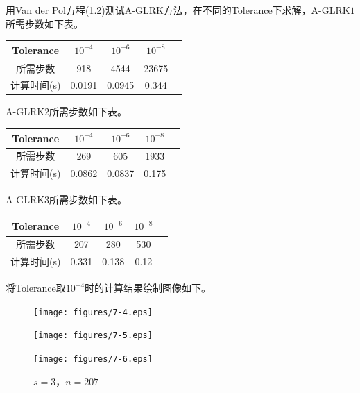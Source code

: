 \documentclass[lang=cn,10pt,bibend=bibtex]{elegantbook}
\begin{document}
用Van der Pol方程(1.2)测试A-GLRK方法，在不同的Tolerance下求解，A-GLRK$1$所需步数如下表。

\vspace{-.8em}
\begin{table}[H]
  \centering
  \begin{tabular}{c|cccc}
    Tolerance & $10^{-4}$ & $10^{-6}$ & $10^{-8}$ \\ \hline
    所需步数 & 918 & 4544 & 23675   \\
    计算时间(s) & 0.0191  & 0.0945  & 0.344  
  \end{tabular}
\end{table}
\vspace{-.8em}

A-GLRK$2$所需步数如下表。

\vspace{-.8em}
\begin{table}[H]
  \centering
  \begin{tabular}{c|cccc}
    Tolerance & $10^{-4}$ & $10^{-6}$ & $10^{-8}$ \\ \hline
    所需步数 & 269 & 605 & 1933   \\
    计算时间(s) & 0.0862  & 0.0837  & 0.175  
  \end{tabular}
\end{table}
\vspace{-.8em}

A-GLRK$3$所需步数如下表。

\vspace{-.8em}
\begin{table}[H]
  \centering
  \begin{tabular}{c|cccc}
    Tolerance & $10^{-4}$ & $10^{-6}$ & $10^{-8}$ \\ \hline
    所需步数 & 207 & 280 & 530   \\
    计算时间(s) & 0.331  & 0.138  & 0.12  
  \end{tabular}
\end{table}
\vspace{-.8em}

将Tolerance取$10^{-4}$时的计算结果绘制图像如下。

\vspace{-.5em}
\begin{figure}[H]
  \centering
  \begin{minipage}[t]{0.32\linewidth}
      \centering
      \texttt{[image: figures/7-4.eps]}
      \caption*{\small $s=1$，$n=918$}
  \end{minipage}
  \hspace{.31em}
  \begin{minipage}[t]{0.32\linewidth}
      \centering
      \texttt{[image: figures/7-5.eps]}
      \caption*{\small $s=2$，$n=269$}
  \end{minipage}
  \hspace{.31em}
  \begin{minipage}[t]{0.32\linewidth}
      \centering
      \texttt{[image: figures/7-6.eps]}
      \caption*{\small $s=3$，$n=207$}
  \end{minipage}
\end{figure}
\vspace{-.5em}
\end{document}
